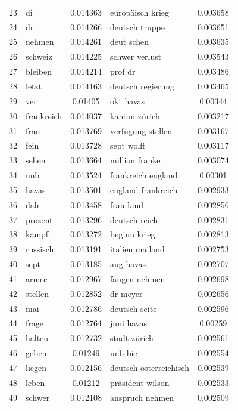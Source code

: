 \documentclass[11pt]{article}
\begin{document}
\begin{table}[H]
\begin{small}
\begin{center}
\begin{tabular*}{\textwidth}{|l|| @{\extracolsep{\fill}} l c || l c |}
23 & di & 0.014363 & europäisch krieg & 0.003658 \\
24 & dr & 0.014266 & deutsch truppe & 0.003651 \\
25 & nehmen & 0.014261 & deut schen & 0.003635 \\
26 & schweiz & 0.014225 & schwer verlust & 0.003543 \\
27 & bleiben & 0.014214 & prof dr & 0.003486 \\
28 & letzt & 0.014163 & deutsch regierung & 0.003465 \\
29 & ver & 0.01405 & okt havas & 0.00344 \\
30 & frankreich & 0.014037 & kanton zürich & 0.003217 \\
31 & frau & 0.013769 & verfügung stellen & 0.003167 \\
32 & fein & 0.013728 & sept wolff & 0.003117 \\
33 & sehen & 0.013664 & million franke & 0.003074 \\
34 & unb & 0.013524 & frankreich england & 0.00301 \\
35 & havas & 0.013501 & england frankreich & 0.002933 \\
36 & dah & 0.013458 & frau kind & 0.002856 \\
37 & prozent & 0.013296 & deutsch reich & 0.002831 \\
38 & kampf & 0.013272 & beginn krieg & 0.002813 \\
39 & russisch & 0.013191 & italien mailand & 0.002753 \\
40 & sept & 0.013185 & aug havas & 0.002707 \\
41 & armee & 0.012967 & fangen nehmen & 0.002698 \\
42 & stellen & 0.012852 & dr meyer & 0.002656 \\
43 & mai & 0.012786 & deutsch seite & 0.002596 \\
44 & frage & 0.012764 & juni havas & 0.00259 \\
45 & halten & 0.012732 & stadt zürich & 0.002561 \\
46 & geben & 0.01249 & unb bie & 0.002554 \\
47 & liegen & 0.012156 & deutsch österreichisch & 0.002539 \\
48 & leben & 0.01212 & präsident wilson & 0.002533 \\
49 & schwer & 0.012108 & anspruch nehmen & 0.002509 \\
\hline
\end{tabular*}
\end{center}
\end{small}
\end{table}
\end{document}
